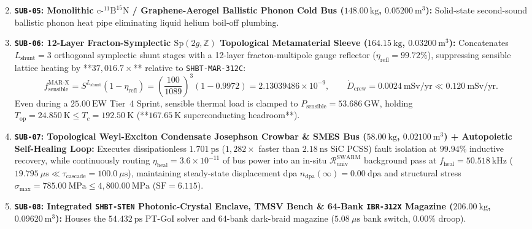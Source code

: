 \documentclass[11pt,onecolumn]{article}
\begin{document}
\begin{enumerate}
\begin{equation}
    \label{eq:mar312x_decx}
    \end{equation}
    \item \textbf{\texttt{SUB-05}: Monolithic $\text{c-}^{11}\text{B}^{15}\text{N}$ / Graphene-Aerogel Ballistic Phonon Cold Bus ($148.00~\mathrm{kg}$, $0.05200~\mathrm{m}^3$):} Solid-state second-sound ballistic phonon heat pipe eliminating liquid helium boil-off plumbing.
    \item \textbf{\texttt{SUB-06}: 12-Layer Fracton-Symplectic $\mathrm{Sp}(2g,\mathbb{Z})$ Topological Metamaterial Sleeve ($164.15~\mathrm{kg}$, $0.03200~\mathrm{m}^3$):} Concatenates $L_{\text{shunt}} = 3$ orthogonal symplectic shunt stages with a 12-layer fracton-multipole gauge reflector ($\eta_{\text{refl}} = 99.72\%$), suppressing sensible lattice heating by **$37{,}016.7\times$** relative to \texttt{SHBT-MAR-312C}:
    \begin{equation}
    f_{\text{sensible}}^{\text{MAR-X}} = S^{L_{\text{shunt}}} (1 - \eta_{\text{refl}}) = \left(\frac{100}{1089}\right)^3 (1 - 0.9972) = 2.13039486\times 10^{-9}, \qquad \dot{D}_{\text{crew}} = 0.0024~\text{mSv/yr} \ll 0.120~\text{mSv/yr}.
    \label{eq:mar312x_sensible}
    \end{equation}
    Even during a $25.00~\text{EW}$ Tier~4 Sprint, sensible thermal load is clamped to $P_{\text{sensible}} = 53.686~\text{GW}$, holding $T_{\text{op}} = 24.850~\text{K} \le T_c = 192.50~\text{K}$ (**$167.65~\text{K}$ superconducting headroom**).
    \item \textbf{\texttt{SUB-07}: Topological Weyl-Exciton Condensate Josephson Crowbar \& SMES Bus ($58.00~\mathrm{kg}$, $0.02100~\mathrm{m}^3$) + Autopoietic Self-Healing Loop:} Executes dissipationless $1.701~\text{ps}$ ($1{,}282\times$ faster than $2.18~\text{ns}$ SiC PCSS) fault isolation at $99.94\%$ inductive recovery, while continuously routing $\eta_{\text{heal}} = 3.6\times 10^{-11}$ of bus power into an in-situ $\mathcal{R}_{\text{univ}}^{\text{SWARM}}$ background pass at $f_{\text{heal}} = 50.518~\text{kHz}$ ($19.795~\mu\text{s} \ll \tau_{\text{cascade}} = 100.0~\mu\text{s}$), maintaining steady-state displacement dpa $n_{\text{dpa}}(\infty) = 0.00~\text{dpa}$ and structural stress $\sigma_{\text{max}} = 785.00~\text{MPa} \le 4{,}800.00~\text{MPa}$ ($\text{SF} = 6.115$).
    \item \textbf{\texttt{SUB-08}: Integrated \texttt{SHBT-STEN} Photonic-Crystal Enclave, TMSV Bench \& 64-Bank \texttt{IBR-312X} Magazine ($206.00~\mathrm{kg}$, $0.09620~\mathrm{m}^3$):} Houses the $54.432~\text{ps}$ PT-GoI solver and 64-bank dark-braid magazine ($5.08~\mu\text{s}$ bank switch, $0.00\%$ droop).
\end{enumerate}
\end{document}
